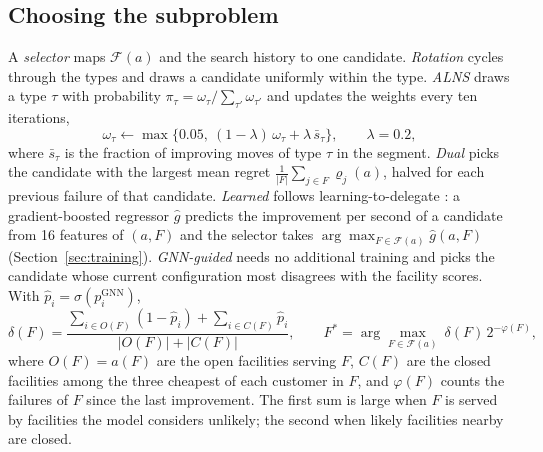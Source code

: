 \subsection{Choosing the subproblem}\label{sec:selectors}
A \emph{selector} maps $\mathcal{F}(a)$ and the search history to one candidate.
\emph{Rotation} cycles through the types and draws a candidate uniformly within the type.
\emph{ALNS} \citep{ropke2006} draws a type $\tau$ with probability
$\pi_\tau=\omega_\tau/\sum_{\tau'}\omega_{\tau'}$ and updates the weights every ten iterations,
\begin{equation}
\omega_\tau\leftarrow\max\bigl\{0.05,\ (1-\lambda)\,\omega_\tau+\lambda\,\bar s_\tau\bigr\},
\qquad \lambda=0.2,
\end{equation}
where $\bar s_\tau$ is the fraction of improving moves of type $\tau$ in the segment.
\emph{Dual} picks the candidate with the largest mean regret
$\frac{1}{|F|}\sum_{j\in F}\varrho_j(a)$, halved for each previous failure of that candidate.
\emph{Learned} follows learning-to-delegate \citep{li2021delegate}: a gradient-boosted regressor
$\hat g$ predicts the improvement per second of a candidate from 16 features of $(a,F)$ and the
selector takes $\arg\max_{F\in\mathcal{F}(a)}\hat g(a,F)$ (Section~\ref{sec:training}).
\emph{GNN-guided} needs no additional training and picks the candidate whose current
configuration most disagrees with the facility scores. With
$\hat p_i=\sigma(p^{\mathrm{GNN}}_i)$,
\begin{equation}\label{eq:delta-gnn}
\delta(F)=\frac{\sum_{i\in O(F)}(1-\hat p_i)+\sum_{i\in C(F)}\hat p_i}{|O(F)|+|C(F)|},
\qquad
F^\ast=\arg\max_{F\in\mathcal{F}(a)}\ \delta(F)\,2^{-\varphi(F)},
\end{equation}
where $O(F)=a(F)$ are the open facilities serving $F$, $C(F)$ are the closed facilities among the
three cheapest of each customer in $F$, and $\varphi(F)$ counts the failures of $F$ since the
last improvement. The first sum is large when $F$ is served by facilities the model considers
unlikely; the second when likely facilities nearby are closed.

